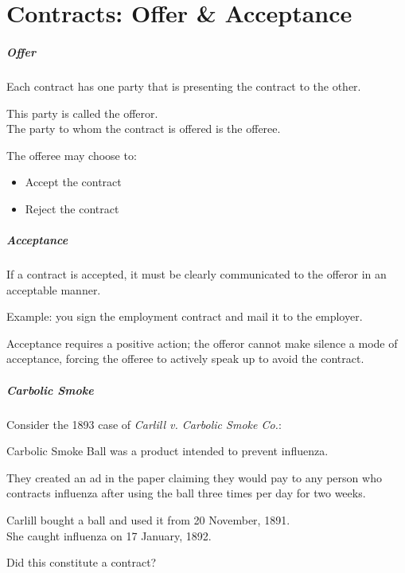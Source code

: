 \part{Contracts: Offer \& Acceptance}
\begin{frame}
\partpage
\end{frame}



\begin{frame}
\frametitle{Offer}

Each contract has one party that is presenting the contract to the other.

This party is called the \alert{offeror}.\\
The party to whom the contract is offered is the \alert{offeree}.

The offeree may choose to:
\begin{itemize}
	\item Accept the contract
	\item Reject the contract
\end{itemize}

\end{frame}

\begin{frame}
\frametitle{Acceptance}

If a contract is accepted, it must be clearly communicated to the offeror in an acceptable manner.

Example: you sign the employment contract and mail it to the employer.

Acceptance requires a positive action; the offeror cannot make silence a mode of acceptance, forcing the offeree to actively speak up to avoid the contract.

\end{frame}

\begin{frame}
\frametitle{Carbolic Smoke}
Consider the 1893 case of \textit{Carlill v. Carbolic Smoke Co.}:

Carbolic Smoke Ball was a product intended to prevent influenza.

They created an ad in the paper claiming they would pay  to any person who contracts influenza after using the ball three times per day for two weeks.

Carlill bought a ball and used it from 20 November, 1891.\\
\quad She caught influenza on 17 January, 1892.

Did this constitute a contract?

\end{frame}


